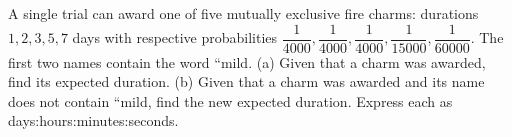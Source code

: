 A single trial can award one of five mutually exclusive fire charms: durations $1,2,3,5,7$ days with respective probabilities $\dfrac{1}{4000},\dfrac{1}{4000},\dfrac{1}{4000},\dfrac{1}{15000},\dfrac{1}{60000}$. The first two names contain the word ``mild. (a) Given that a charm was awarded, find its expected duration. (b) Given that a charm was awarded and its name does not contain ``mild, find the new expected duration. Express each as days:hours:minutes:seconds.
